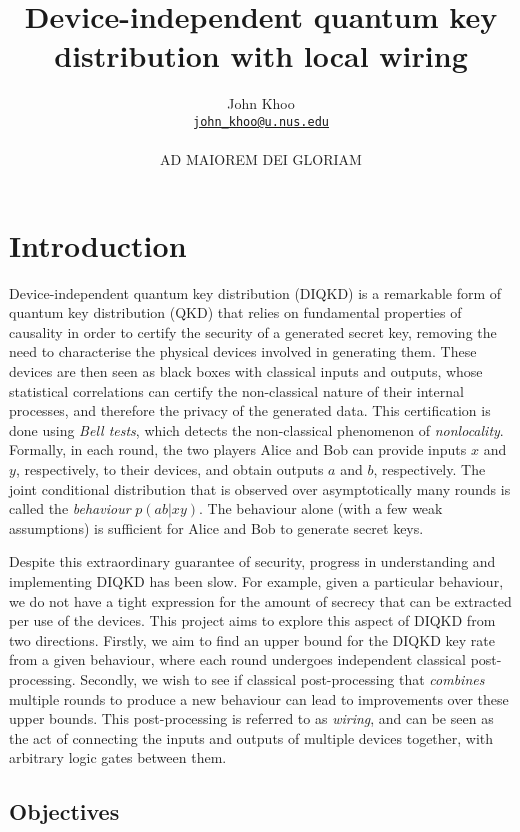 \documentclass[10pt, a4paper]{article}
\title{Device-independent quantum key distribution with local wiring}
\author{John Khoo\\ \href{mailto:john_khoo@u.nus.edu}{\texttt{john\_khoo@u.nus.edu}} \\\\ AD MAIOREM DEI GLORIAM}
\newcommand{\?}{\mathrel{?}} %
\numberwithin{equation}{section} %
\theoremstyle{definition}
\theoremstyle{plain}
\theoremstyle{plain}
\begin{document}
  \maketitle

  \section{Introduction}

  Device-independent quantum key distribution (DIQKD) is a remarkable form of quantum key distribution (QKD) that relies on fundamental properties of causality in order to certify the security of a generated secret key, removing the need to characterise the physical devices involved in generating them. These devices are then seen as black boxes with classical inputs and outputs, whose statistical correlations can certify the non-classical nature of their internal processes, and therefore the privacy of the generated data. This certification is done using \emph{Bell tests}, which detects the non-classical phenomenon of \emph{nonlocality}. Formally, in each round, the two players Alice and Bob can provide inputs \(x\) and \(y\), respectively, to their devices, and obtain outputs \(a\) and \(b\), respectively. The joint conditional distribution that is observed over asymptotically many rounds is called the \emph{behaviour} \(p(ab|xy)\). The behaviour alone (with a few weak assumptions) is sufficient for Alice and Bob to generate secret keys.

  Despite this extraordinary guarantee of security, progress in understanding and implementing DIQKD has been slow. For example, given a particular behaviour, we do not have a tight expression for the amount of secrecy that can be extracted per use of the devices. This project aims to explore this aspect of DIQKD from two directions. Firstly, we aim to find an upper bound for the DIQKD key rate from a given behaviour, where each round undergoes independent classical post-processing. Secondly, we wish to see if classical post-processing that \emph{combines} multiple rounds to produce a new behaviour can lead to improvements over these upper bounds. This post-processing is referred to as \emph{wiring}, and can be seen as the act of connecting the inputs and outputs of multiple devices together, with arbitrary logic gates between them.

  \subsection{Objectives}
\end{document}
